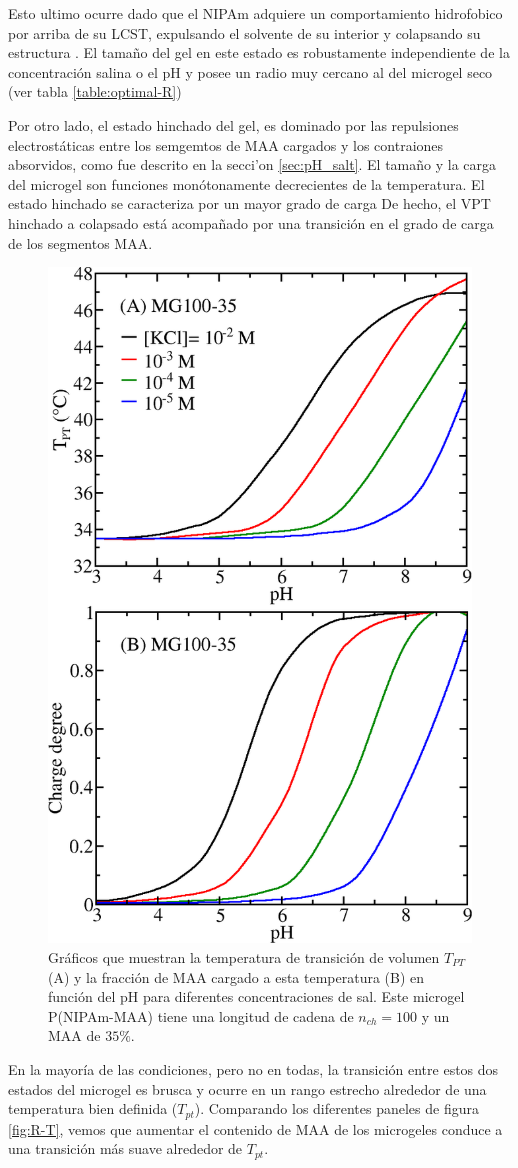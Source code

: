 Esto ultimo ocurre dado que el NIPAm adquiere un comportamiento hidrofobico por arriba de su LCST, expulsando el solvente de su interior y colapsando su estructura .
El tama\~no del gel en este estado es robustamente independiente de la concentraci\'on salina o el pH y posee un radio muy cercano al del microgel seco (ver tabla \ref{table:optimal-R})



Por otro lado, el estado hinchado del gel, es dominado por las repulsiones electrost\'aticas entre los semgemtos de MAA cargados y los contraiones absorvidos, como fue descrito en la secci'on \ref{sec:pH_salt}.
El tama\~no y la carga del microgel son funciones mon\'otonamente decrecientes de
la temperatura.
El estado hinchado se caracteriza por un mayor grado de carga %
De hecho, el VPT hinchado a colapsado est\'a acompa\~nado por una transici\'on en el grado de carga de los segmentos MAA.


\begin{figure}[!htb]
	\centering
	\includegraphics[width=0.5\linewidth]{Figures/graph-gel/Tpt-pH.png}
	\caption{Gr\'aficos que muestran la temperatura de transici\'on de volumen $T_{PT}$ (A) y la fracci\'on de MAA cargado a esta temperatura (B) en funci\'on del pH para diferentes concentraciones de sal.
		Este microgel P(NIPAm-MAA) tiene una longitud de cadena de $n_{ch}=100$ y un MAA de $35\%$.}
	\label{fig:Tpt-pH}
\end{figure}


En la mayor\'ia de las condiciones, pero no en todas, la transici\'on entre estos dos estados del microgel es brusca y ocurre en un rango estrecho alrededor de una temperatura bien definida ($T_{pt}$).
Comparando los diferentes paneles de figura \ref{fig:R-T}, vemos que aumentar el contenido de MAA de los microgeles conduce a una transici\'on m\'as suave alrededor de $T_{pt}$.



